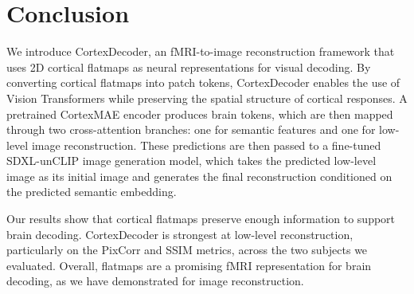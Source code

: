 \section{Conclusion}
\label{sec:conclusion}
We introduce CortexDecoder, an fMRI-to-image reconstruction framework that uses 2D cortical flatmaps as neural representations for visual decoding. By converting cortical flatmaps into patch tokens, CortexDecoder enables the use of Vision Transformers while preserving the spatial structure of cortical responses. A pretrained CortexMAE encoder produces brain tokens, which are then mapped through two cross-attention branches: one for semantic features and one for low-level image reconstruction. These predictions are then passed to a fine-tuned SDXL-unCLIP image generation model, which takes the predicted low-level image as its initial image and generates the final reconstruction conditioned on the predicted semantic embedding.

Our results show that cortical flatmaps preserve enough information to support brain decoding. CortexDecoder is strongest at low-level reconstruction, particularly on the PixCorr and SSIM metrics, across the two subjects we evaluated. Overall, flatmaps are a promising fMRI representation for brain decoding, as we have demonstrated for image reconstruction.
